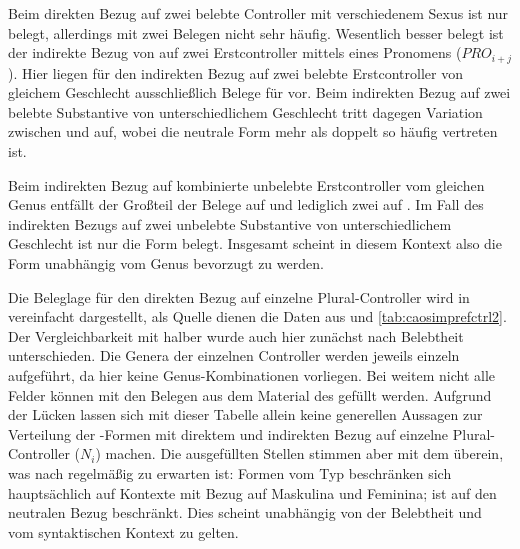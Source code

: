 Beim direkten Bezug auf zwei belebte Controller mit verschiedenem Sexus ist nur
 belegt, allerdings mit zwei Belegen nicht sehr häufig. Wesentlich
besser belegt ist der indirekte Bezug von  auf zwei Erstcontroller
mittels eines Pronomens ($PRO_{i+j}$). Hier liegen für den indirekten Bezug auf
zwei belebte Erstcontroller von gleichem Geschlecht ausschließlich Belege für
 vor. Beim indirekten Bezug auf zwei belebte Substantive von
unterschiedlichem Geschlecht tritt dagegen Variation zwischen  und
 auf, wobei die neutrale Form  mehr als doppelt so
häufig vertreten ist.

Beim indirekten Bezug auf kombinierte unbelebte Erstcontroller vom gleichen
Genus entfällt der Großteil der Belege auf  und lediglich zwei auf
. Im Fall des indirekten Bezugs auf zwei unbelebte Substantive von
unterschiedlichem Geschlecht ist nur die Form  belegt. Insgesamt
scheint in diesem Kontext also die Form  unabhängig vom Genus
bevorzugt zu werden.

Die Beleglage für den direkten Bezug auf einzelne Plural-Controller wird in
 vereinfacht dargestellt, als Quelle dienen die Daten
aus  und \ref{tab:caosimprefctrl2}. Der
Vergleichbarkeit mit  halber wurde auch hier
zunächst nach Belebtheit unterschieden. Die Genera der einzelnen Controller
werden jeweils einzeln aufgeführt, da hier keine Genus-Kombinationen vorliegen.
Bei weitem nicht alle Felder können mit den Belegen aus dem Material des \CAO{}
gefüllt werden. Aufgrund der Lücken lassen sich mit dieser Tabelle allein keine
generellen Aussagen zur Verteilung der -Formen mit direktem und
indirekten Bezug auf einzelne Plural-Controller ($N_i$) machen. Die
ausgefüllten Stellen stimmen aber mit dem überein, was nach
 regelmäßig zu erwarten ist: Formen vom Typ 
beschränken sich hauptsächlich auf Kon\-texte mit Bezug auf Maskulina und
Feminina;  ist auf den neutralen Bezug beschränkt. Dies scheint
unabhängig von der Belebtheit und vom syntaktischen Kontext zu gelten.

